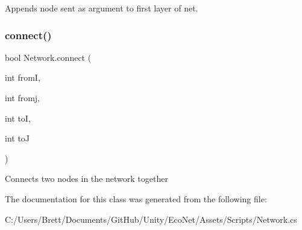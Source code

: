Appends node sent as argument to first layer of net. 

\mbox{\label{class_network_a52c2afe3c1b3e462b5b18353d09c7a1b}} 
\subsubsection{\texorpdfstring{connect()}{connect()}}
{\footnotesize\ttfamily bool Network.\+connect (\begin{DoxyParamCaption}\item[{int}]{fromI,  }\item[{int}]{fromj,  }\item[{int}]{toI,  }\item[{int}]{toJ }\end{DoxyParamCaption})}

Connects two nodes in the network together

The documentation for this class was generated from the following file\+:\begin{DoxyCompactItemize}
\item 
C\+:/\+Users/\+Brett/\+Documents/\+Git\+Hub/\+Unity/\+Eco\+Net/\+Assets/\+Scripts/Network.\+cs\end{DoxyCompactItemize}
